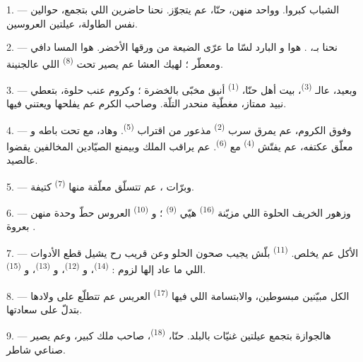\VUsaut{1.6mm}
\VUsaut{2.6mm}

\VUsaut{3.0mm}

1. --- الشباب كبروا. وواحد منهن، حنّا، عم يتجوّز. نحنا حاضرين
 اللي بتجمع، حوالين نفس الطاولة، عيلتين العروسين.

2. --- نحنا بـ، . هوا
 و البارد لسّا ما عرّى الضيعة
من ورقها الأخضر. هوا المسا دافي ومعطّر ؛ لهيك العشا عم يصير تحت
 \textsuperscript{(8)} اللي عالجنينة.

3. --- وبعيد، عالـ \textsuperscript{(3)}، بيت أهل حنّا،
 \textsuperscript{(1)} أنيق مخبّى بالخضرة ؛ وكروم عنب حلوة،
بتعطي نبيد ممتاز، مغطّية منحدر التلّة. وصاحب الكرم عم يفلحها ويعتني
فيها.

4. --- وفوق الكروم، عم يمرق سرب  \textsuperscript{(2)}
مذعور من اقتراب  \textsuperscript{(5)}. وهاد، مع
 تحت باطه و معلّق عكتفه، عم يفتّش
 \textsuperscript{(4)} مع  \textsuperscript{(6)}.
عم يراقب الملك وبيمنع الصيّادين المخالفين يقضوا عالصيد.

5. --- وبرّات ، عم تتسلّق  معلّقة
منها  \textsuperscript{(7)} كتيفة.

6. --- وزهور الخريف الحلوة اللي مزيّنة 
\textsuperscript{(16)} هيّي  \textsuperscript{(9)} ؛
و \textsuperscript{(10)} العروس حطّ وحدة منهن بعروة
.

7. --- الأكل عم يخلص.  \textsuperscript{(11)} بلّش يجيب
صحون الحلو وعن قريب رح يشيل قطع الأدوات اللي ما عاد إلها لزوم :
 \textsuperscript{(14)}، و \textsuperscript{(12)}،
و \textsuperscript{(13)}، و
\textsuperscript{(15)}.

\VUsaut{3.0mm}

8. --- الكل مبيّنين مبسوطين، والابتسامة اللي فيها 
\textsuperscript{(17)} العريس عم تتطلّع على ولادها بتدلّ على سعادتها.

9. --- هالجوازة بتجمع عيلتين غنيّات بالبلد. حنّا، 
\textsuperscript{(18)}،  صاحب ملك كبير، وعم يصير
 صناعي شاطر.

